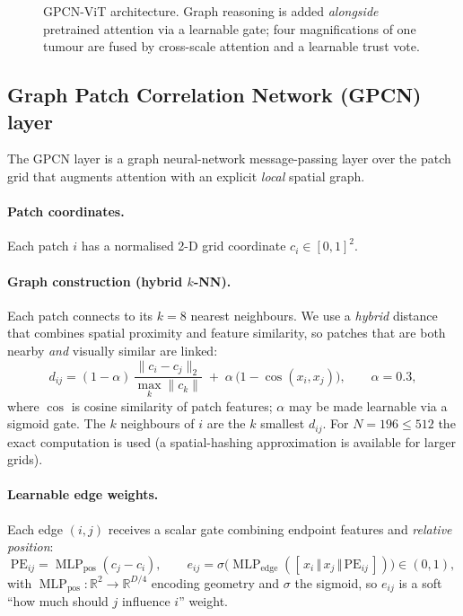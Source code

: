 \documentclass[11pt]{article}
\DeclareMathOperator{\MLP}{MLP}
\begin{document}
\begin{figure}[t]
  \centering
  \caption{GPCN-ViT architecture. Graph reasoning is added \emph{alongside}
  pretrained attention via a learnable gate; four magnifications of one tumour
  are fused by cross-scale attention and a learnable trust vote.}
  \label{fig:arch}
\end{figure}

\subsection{Graph Patch Correlation Network (GPCN) layer}
\label{sec:gpcn}
The GPCN layer is a graph neural-network message-passing layer over the patch
grid that augments attention with an explicit \emph{local} spatial graph.

\paragraph{Patch coordinates.} Each patch $i$ has a normalised 2-D grid
coordinate $c_i\in[0,1]^2$.

\paragraph{Graph construction (hybrid $k$-NN).} Each patch connects to its $k=8$
nearest neighbours. We use a \emph{hybrid} distance that combines spatial
proximity and feature similarity, so patches that are both nearby \emph{and}
visually similar are linked:
\begin{equation}
d_{ij} = (1-\alpha)\,\frac{\lVert c_i - c_j\rVert_2}{\max_k\lVert c_k\rVert}
\;+\; \alpha\,\big(1-\cos(x_i,x_j)\big), \qquad \alpha=0.3,
\label{eq:hybridknn}
\end{equation}
where $\cos$ is cosine similarity of patch features; $\alpha$ may be made
learnable via a sigmoid gate. The $k$ neighbours of $i$ are the $k$ smallest
$d_{ij}$. For $N=196\le512$ the exact computation is used (a spatial-hashing
approximation is available for larger grids).

\paragraph{Learnable edge weights.} Each edge $(i,j)$ receives a scalar gate
combining endpoint features and \emph{relative position}:
\begin{equation}
\mathrm{PE}_{ij}=\MLP_{\text{pos}}(c_j-c_i),\qquad
e_{ij}=\sigma\!\big(\MLP_{\text{edge}}([\,x_i \,\Vert\, x_j \,\Vert\, \mathrm{PE}_{ij}\,])\big)\in(0,1),
\label{eq:edge}
\end{equation}
with $\MLP_{\text{pos}}:\mathbb{R}^2\!\to\!\mathbb{R}^{D/4}$ encoding geometry and
$\sigma$ the sigmoid, so $e_{ij}$ is a soft ``how much should $j$ influence $i$''
weight.
\end{document}
